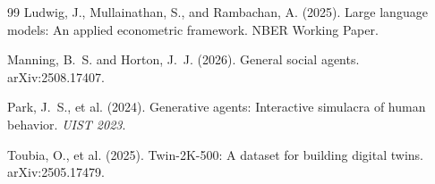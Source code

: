 \documentclass[12pt]{article}
\begin{document}
\begin{thebibliography}{99}
Ludwig, J., Mullainathan, S., and Rambachan, A. (2025).
\newblock Large language models: An applied econometric framework.
\newblock NBER Working Paper.

Manning, B.~S. and Horton, J.~J. (2026).
\newblock General social agents.
\newblock arXiv:2508.17407.

Park, J.~S., et al. (2024).
\newblock Generative agents: Interactive simulacra of human behavior.
\newblock \textit{UIST 2023}.

Toubia, O., et al. (2025).
\newblock Twin-2K-500: A dataset for building digital twins.
\newblock arXiv:2505.17479.

\end{thebibliography}
\end{document}
